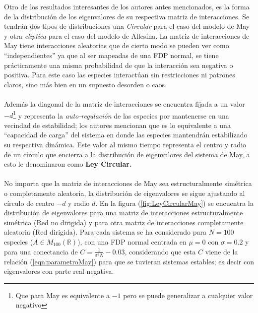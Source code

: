 Otro de los resultados interesantes de los autores antes mencionados, es la forma de la distribución de los eigenvalores de su respectiva matriz de interacciones. Se tendrán dos tipos de distribuciones una \textit{Circular} para el caso del modelo de May y otra \textit{elíptica} para el caso del modelo de Allesina. La matriz de interacciones de May tiene interacciones aleatorias que de cierto modo se pueden ver como ``independientes'' ya que al ser mapeadas de una FDP normal, se tiene prácticamente una misma probabilidad de que la interacción sea negativa o positiva. Para este caso las especies interactúan sin restricciones ni patrones claros, sino más bien en un supuesto desorden o caos.\\
\\
Además la diagonal de la matriz de interacciones se encuentra fijada a un valor $-d$\footnote{Que para May es equivalente a $-1$ pero se puede generalizar a cualquier valor negativo} y representa la \textit{auto-regulación} de las especies por mantenerse en una vecindad de estabilidad; los autores mencionan que es lo equivalente a una ``capacidad de carga'' del sistema en donde las especies mantendrán estabilizado su respectiva dinámica. Este valor al mismo tiempo representa el centro y radio de un círculo que encierra a la distribución de eigenvalores del sistema de May, a esto le denominaron como \textbf{Ley Circular.}\\
\\
No importa que la matriz de interacciones de May sea estructuralmente simétrica o completamente aleatoria, la distribución de eigenvalores se sigue ajustando al círculo de centro $-d$ y radio $d$. En la figura (\ref{fig:LeyCircularMay}) se encuentra la distribución de eigenvalores para una matriz de interacciones estructuralmente simétrica (Red no dirigida) y para otra matriz de interacciones completamente aleatoria (Red dirigida). Para cada sistema se ha considerado para $N=100$ especies ($A\in M_{100}(\mathbb{R})$), con una FDP normal centrada en $\mu=0$ con $\sigma=0.2$ y para una conectancia de $C=\frac{1}{\sigma^2 N}-0.03$, considerando que esta $C$ viene de la relación (\ref{eqn:parametroMay}) para que se tuvieran sistemas estables; es decir con eigenvalores con parte real negativa.
